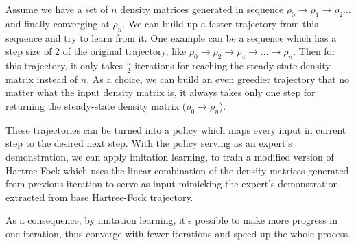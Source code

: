 \documentclass[twoside]{article}
\begin{document}

Assume we have a set of $n$ density matrices generated in sequence   $\rho_0 \rightarrow  \rho_1 \rightarrow  \rho_2  \ldots  $ and finally converging at $\rho_{n}$. 
We can build up a faster trajectory from this sequence and try to learn from it.
One example can be a sequence which has a step size of 2 of the original trajectory, like $\rho_0 \rightarrow \rho_2 \rightarrow  \rho_4 \rightarrow  \ldots \rightarrow  \rho_{n}$. Then for this trajectory, it only takes $\frac{n}{2}$ iterations for reaching the steady-state density matrix instead of $n$.
As a choice, we can build an even greedier trajectory that no matter what the input density matrix is, it always takes only one step for returning the steady-state density matrix ($\rho_0 \rightarrow \rho_{n}$).


These trajectories can be turned into a policy which maps every input in current step to the desired next step. With the policy serving as an expert's demonstration, we can apply imitation learning, to train a modified version of Hartree-Fock which uses the linear combination of the density matrices generated from previous iteration to serve as input mimicking the expert's demonstration extracted from base Hartree-Fock trajectory.

As a consequence, by imitation learning, it's possible to make more progress in one iteration, thus converge with fewer iterations and speed up the whole process.  




\end{document}
